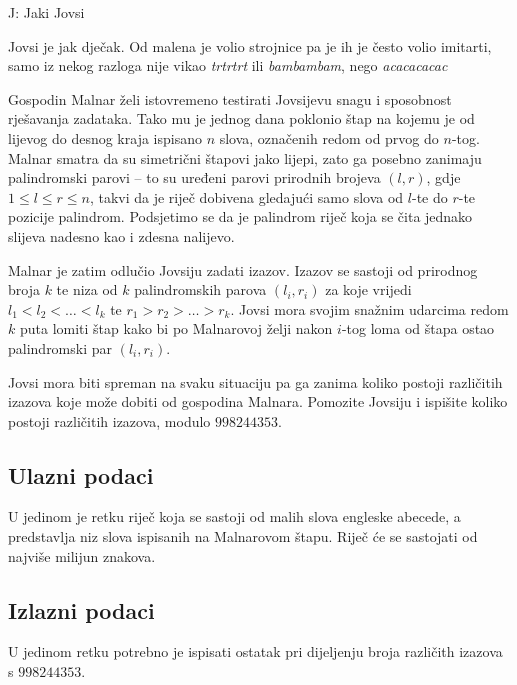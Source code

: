 \begin{statement}[
  timelimit=1 s,
  memorylimit=512 MiB,
]{J: Jaki Jovsi}

Jovsi je jak dječak. Od malena je volio strojnice pa je ih je često volio
imitarti, samo iz nekog razloga nije vikao \textit{trtrtrt} ili
\textit{bambambam}, nego \textit{acacacacac}

Gospodin Malnar želi istovremeno testirati Jovsijevu snagu i sposobnost
rješavanja zadataka. Tako mu je jednog dana poklonio štap na kojemu je od
lijevog do desnog kraja ispisano $n$ slova, označenih redom od prvog do $n$-tog.
Malnar smatra da su simetrični štapovi jako lijepi, zato ga posebno zanimaju
palindromski parovi -- to su uređeni parovi prirodnih brojeva $(l, r)$, gdje
$1 \le l \le r \le n$, takvi da je riječ dobivena gledajući samo slova od $l$-te
do $r$-te pozicije palindrom. Podsjetimo se da je palindrom riječ koja se čita
jednako slijeva nadesno kao i zdesna nalijevo.

Malnar je zatim odlučio Jovsiju zadati izazov. Izazov se sastoji od prirodnog
broja $k$ te niza od $k$ palindromskih parova $(l_i, r_i)$ za koje vrijedi
$l_1 < l_2 < \dots < l_k$ te $r_1 > r_2 > \dots > r_k$. Jovsi mora svojim
snažnim udarcima redom $k$ puta lomiti štap kako bi po Malnarovoj želji nakon
$i$-tog loma od štapa ostao palindromski par $(l_i, r_i)$.

Jovsi mora biti spreman na svaku situaciju pa ga zanima koliko postoji
različitih izazova koje može dobiti od gospodina Malnara. Pomozite Jovsiju i
ispišite koliko postoji različitih izazova, modulo $998244353$.

\subsection*{Ulazni podaci}
U jedinom je retku riječ koja se sastoji od malih slova engleske abecede, a
predstavlja niz slova ispisanih na Malnarovom štapu. Riječ će se sastojati
od najviše milijun znakova.

\subsection*{Izlazni podaci}
U jedinom retku potrebno je ispisati ostatak pri dijeljenju broja različith
izazova s $998244353$.


\end{statement}
